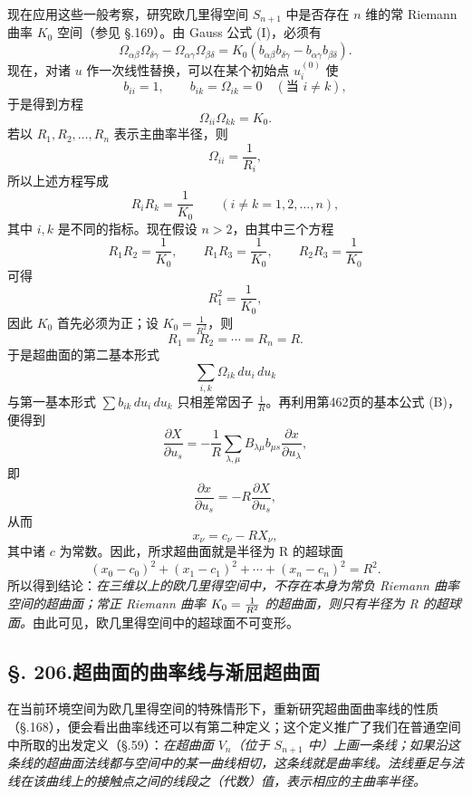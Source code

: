 现在应用这些一般考察，研究欧几里得空间 $S_{n+1}$ 中是否存在 $n$ 维的常 Riemann 曲率 $K_0$ 空间（参见 \S.169）。由 Gauss 公式 (I)，必须有
\[
\Omega_{\alpha\beta}\Omega_{\delta\gamma}-\Omega_{\alpha\gamma}\Omega_{\beta\delta}
=K_0(b_{\alpha\beta}b_{\delta\gamma}-b_{\alpha\gamma}b_{\beta\delta}).
\]
现在，对诸 $u$ 作一次线性替换，可以在某个初始点 $u_i^{(0)}$ 使
\[
b_{ii}=1,\qquad b_{ik}=\Omega_{ik}=0\quad(\text{当 }i\ne k),
\]
于是得到方程
\[
\Omega_{ii}\Omega_{kk}=K_0.
\]
若以 $R_1,R_2,\ldots,R_n$ 表示主曲率半径，则
\[
\Omega_{ii}=\frac1{R_i},
\]
所以上述方程写成
\[
R_iR_k=\frac1{K_0}\qquad (i\ne k=1,2,\ldots,n),
\]
其中 $i,k$ 是不同的指标。现在假设 $n>2$，由其中三个方程
\[
R_1R_2=\frac1{K_0},\qquad
R_1R_3=\frac1{K_0},\qquad
R_2R_3=\frac1{K_0}
\]
可得
\[
R_1^2=\frac1{K_0},
\]
因此 $K_0$ 首先必须为正；设 $K_0=\frac1{R^2}$，则
\[
R_1=R_2=\cdots=R_n=R.
\]
于是超曲面的第二基本形式
\[
\sum_{i,k}\Omega_{ik}\,du_i\,du_k
\]
与第一基本形式 $\sum b_{ik}\,du_i\,du_k$ 只相差常因子 $\frac1R$。再利用第462页的基本公式 (B)，便得到
\[
\frac{\partial X}{\partial u_s}
=-\frac1R\sum_{\lambda,\mu}B_{\lambda\mu}b_{\mu s}\frac{\partial x}{\partial u_\lambda},
\]
即
\[
\frac{\partial x}{\partial u_s}=-R\frac{\partial X}{\partial u_s},
\]
从而
\[
x_\nu=c_\nu-RX_\nu,
\]
其中诸 $c$ 为常数。因此，所求超曲面就是半径为 R 的超球面
\[
(x_0-c_0)^2+(x_1-c_1)^2+\cdots+(x_n-c_n)^2=R^2.
\]
所以得到结论：\emph{在三维以上的欧几里得空间中，不存在本身为常负 Riemann 曲率空间的超曲面；常正 Riemann 曲率 $K_0=\frac1{R^2}$ 的超曲面，则只有半径为 R 的超球面。}由此可见，欧几里得空间中的超球面不可变形。

\subsection*{\S. 206.\quad 超曲面的曲率线与渐屈超曲面}

在当前环境空间为欧几里得空间的特殊情形下，重新研究超曲面曲率线的性质（\S.168），便会看出曲率线还可以有第二种定义；这个定义推广了我们在普通空间中所取的出发定义（\S.59）：\emph{在超曲面 $V_n$（位于 $S_{n+1}$ 中）上画一条线；如果沿这条线的超曲面法线都与空间中的某一曲线相切，这条线就是曲率线。法线垂足与法线在该曲线上的接触点之间的线段之（代数）值，表示相应的主曲率半径。}


